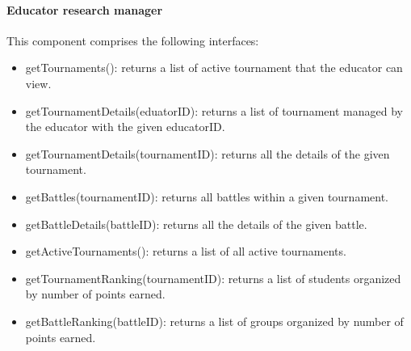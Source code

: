 \documentclass[12pt, a4paper]{report}
\begin{document}
    \paragraph*{Educator research manager}
    This component comprises the following interfaces: 
    \begin{itemize}
        \item getTournaments(): returns a list of active tournament that the educator can view. 
        \item getTournamentDetails(eduatorID): returns a list of tournament managed by the educator with the given educatorID. 
        \item getTournamentDetails(tournamentID): returns all the details of the given tournament. 
        \item getBattles(tournamentID): returns all battles within a given tournament. 
        \item getBattleDetails(battleID): returns all the details of the given battle. 
        \item getActiveTournaments(): returns a list of all active tournaments.
        \item getTournamentRanking(tournamentID): returns a list of students organized by number of points earned. 
        \item getBattleRanking(battleID): returns a list of groups organized by number of points earned. 
    \end{itemize}
\end{document}
